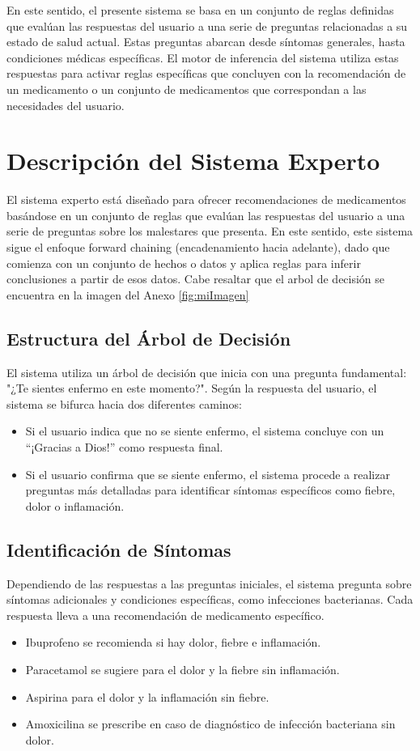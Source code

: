 \documentclass[11pt]{article}
\begin{document}
\begin{multicols}{2}
En este sentido, el presente sistema se basa en un conjunto de reglas definidas que evalúan las respuestas del usuario a una serie de preguntas relacionadas a su estado de salud actual. Estas preguntas abarcan desde síntomas generales, hasta condiciones médicas específicas. El motor de inferencia del sistema utiliza estas respuestas para activar reglas específicas que concluyen con la recomendación de un medicamento o un conjunto de medicamentos que correspondan a las necesidades del usuario.


\section{Descripción del Sistema Experto}

El sistema experto está diseñado para ofrecer recomendaciones de medicamentos basándose en un conjunto de reglas que evalúan las respuestas del usuario a una serie de preguntas sobre los malestares que presenta. En este sentido, este sistema sigue el enfoque forward chaining (encadenamiento hacia adelante), dado que comienza con un conjunto de hechos o datos y aplica reglas para inferir conclusiones a partir de esos datos. Cabe resaltar que el arbol de decisión se encuentra en la imagen del Anexo \ref{fig:miImagen}


\subsection{Estructura del Árbol de Decisión}
El sistema utiliza un árbol de decisión que inicia con una pregunta fundamental: "¿Te sientes enfermo en este momento?". Según la respuesta del usuario, el sistema se bifurca hacia dos diferentes caminos:
\begin{itemize}
    \item Si el usuario indica que no se siente enfermo, el sistema concluye con un ``¡Gracias a Dios!'' como respuesta final.
    \item Si el usuario confirma que se siente enfermo, el sistema procede a realizar preguntas más detalladas para identificar síntomas específicos como fiebre, dolor o inflamación.
\end{itemize}

\subsection{Identificación de Síntomas}
Dependiendo de las respuestas a las preguntas iniciales, el sistema pregunta sobre síntomas adicionales y condiciones específicas, como infecciones bacterianas. Cada respuesta lleva a una recomendación de medicamento específico. 
\begin{itemize}
    \item Ibuprofeno se recomienda si hay dolor, fiebre e inflamación.
    \item Paracetamol se sugiere para el dolor y la fiebre sin inflamación.
    \item Aspirina para el dolor y la inflamación sin fiebre.
    \item Amoxicilina se prescribe en caso de diagnóstico de infección bacteriana sin dolor.
\end{itemize}


\end{multicols}
\end{document}
